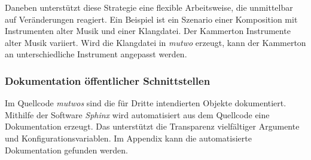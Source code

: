 \documentclass[12pt,a4paper,ngerman]{article}
\begin{document}
\vspace{-0.5cm}

\begin{center}
\end{center}

Daneben unterstützt diese Strategie eine flexible Arbeitsweise, die unmittelbar auf Veränderungen reagiert.
Ein Beispiel ist ein Szenario einer Komposition mit Instrumenten alter Musik und einer Klangdatei.
Der Kammerton Instrumente alter Musik variiert.
Wird die Klangdatei in \emph{mutwo} erzeugt, kann der Kammerton an unterschiedliche Instrument angepasst werden.

\subsubsection{Dokumentation öffentlicher Schnittstellen}

Im Quellcode \emph{mutwos} sind die für Dritte intendierten Objekte dokumentiert.
Mithilfe der Software \emph{Sphinx} wird automatisiert aus dem Quellcode eine Dokumentation erzeugt.
Das unterstützt die Transparenz vielfältiger Argumente und Konfigurationsvariablen.
Im Appendix kann die automatisierte Dokumentation gefunden werden.
\end{document}
